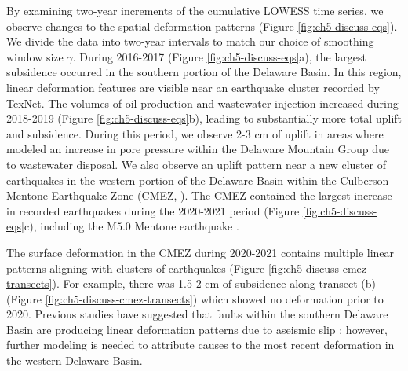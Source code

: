 \FloatBarrier




By examining two-year increments of the cumulative LOWESS time series, we observe changes to the spatial deformation patterns (Figure \ref{fig:ch5-discuss-eqs}).
We divide the data into two-year intervals to match our choice of smoothing window size $ \gamma $.
During 2016-2017 (Figure \ref{fig:ch5-discuss-eqs}a), the largest subsidence occurred in the southern portion of the Delaware Basin. In this region, linear deformation features are visible near an earthquake cluster recorded by TexNet.
The volumes of oil production and wastewater injection increased during 2018-2019 (Figure \ref{fig:ch5-discuss-eqs}b), leading to substantially more total uplift and subsidence. 
During this period, we observe 2-3 cm of uplift in areas where \cite{Ge2022RecentWaterDisposal} modeled an increase in pore pressure within the Delaware Mountain Group due to wastewater disposal.
We also observe an uplift pattern near a new cluster of earthquakes in the western portion of the Delaware Basin within the Culberson-Mentone Earthquake Zone (CMEZ, \cite{Hennings2021StabilityFaultSystems}).
The CMEZ contained the largest increase in recorded earthquakes during the 2020-2021 period (Figure \ref{fig:ch5-discuss-eqs}c), including the M$ 5.0 $ Mentone earthquake \citep{Skoumal2020InducedMw5.0}. 

The surface deformation in the CMEZ during 2020-2021 contains multiple linear patterns aligning with clusters of earthquakes (Figure \ref{fig:ch5-discuss-cmez-transects}). For example, there was 1.5-2 cm of subsidence along transect (b) (Figure \ref{fig:ch5-discuss-cmez-transects}) which showed no deformation prior to 2020.
Previous studies have suggested that faults within the southern Delaware Basin are producing linear deformation patterns due to aseismic slip  \citep{Pepin2022ShallowAseismicSlip}; however, further modeling is needed to attribute causes to the most recent deformation in the western Delaware Basin.

